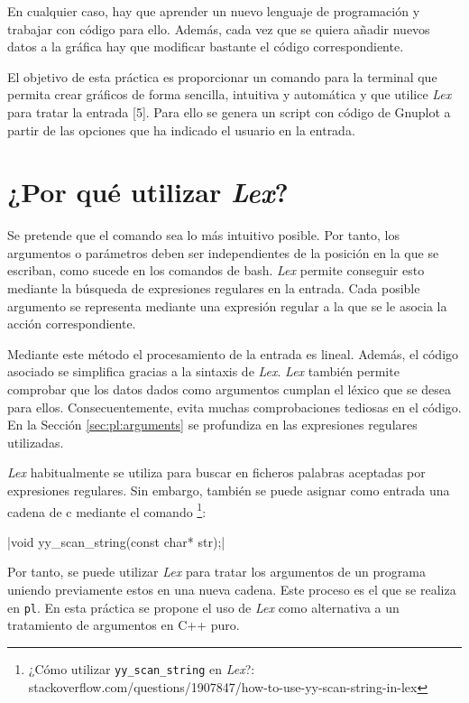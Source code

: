 \documentclass{article}
\begin{document}
	En cualquier caso, hay que aprender un nuevo lenguaje de programación y trabajar con código para ello. Además, cada vez que se quiera añadir nuevos datos a la gráfica hay que modificar bastante el código correspondiente.
	
	El objetivo de esta práctica es proporcionar un comando para la terminal que permita crear gráficos de forma sencilla, intuitiva y automática y que utilice \textit{Lex} para tratar la entrada [5]. Para ello se genera un script con código de Gnuplot a partir de las opciones que ha indicado el usuario en la entrada.


\section{¿Por qué utilizar \textit{Lex}?}

	Se pretende que el comando sea lo más intuitivo posible. Por tanto, los argumentos o parámetros deben ser independientes de la posición en la que se escriban, como sucede en los comandos de bash. \textit{Lex} permite conseguir esto mediante la búsqueda de expresiones regulares en la entrada. Cada posible argumento se representa mediante una expresión regular a la que se le asocia la acción correspondiente. 
	
	Mediante este método el procesamiento de la entrada es lineal. Además, el código asociado se simplifica gracias a la sintaxis de \textit{Lex}. \textit{Lex} también permite comprobar que los datos dados como argumentos cumplan el léxico que se desea para ellos. Consecuentemente, evita muchas comprobaciones tediosas en el código. En la Sección \ref{sec:pl:arguments} se profundiza en las expresiones regulares utilizadas.
	
	\textit{Lex} habitualmente se utiliza para buscar en ficheros palabras aceptadas por expresiones regulares. Sin embargo, también se puede asignar como entrada una cadena de c mediante el comando \footnote{¿Cómo utilizar \texttt{yy\_scan\_string} en \textit{Lex}?: stackoverflow.com/questions/1907847/how-to-use-yy-scan-string-in-lex}:
	
	|void yy_scan_string(const char* str);|

	Por tanto, se puede utilizar \textit{Lex} para tratar los argumentos de un programa uniendo previamente estos en una nueva cadena. Este proceso es el que se realiza en \texttt{pl}. En esta práctica se propone el uso de \textit{Lex} como alternativa a un tratamiento de argumentos en C++ puro.
\end{document}

